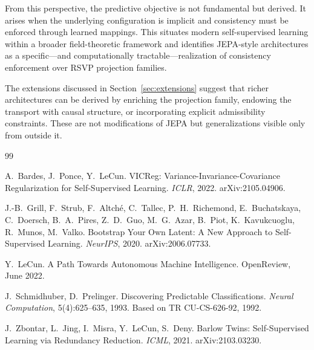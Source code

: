 \documentclass[12pt, oneside]{article}
\begin{document}
From this perspective, the predictive objective is not fundamental but derived. It arises when the underlying configuration is implicit and consistency must be enforced through learned mappings. This situates modern self-supervised learning within a broader field-theoretic framework and identifies JEPA-style architectures as a specific---and computationally tractable---realization of consistency enforcement over RSVP projection families.

The extensions discussed in Section~\ref{sec:extensions} suggest that richer architectures can be derived by enriching the projection family, endowing the transport with causal structure, or incorporating explicit admissibility constraints. These are not modifications of JEPA but generalizations visible only from outside it.

\bigskip

\begin{thebibliography}{99}

A.\ Bardes, J.\ Ponce, Y.\ LeCun.
\newblock VICReg: Variance-Invariance-Covariance Regularization for Self-Supervised Learning.
\newblock \textit{ICLR}, 2022. arXiv:2105.04906.

J.-B.\ Grill, F.\ Strub, F.\ Altch\'e, C.\ Tallec, P.\ H.\ Richemond, E.\ Buchatskaya, C.\ Doersch, B.\ A.\ Pires, Z.\ D.\ Guo, M.\ G.\ Azar, B.\ Piot, K.\ Kavukcuoglu, R.\ Munos, M.\ Valko.
\newblock Bootstrap Your Own Latent: A New Approach to Self-Supervised Learning.
\newblock \textit{NeurIPS}, 2020. arXiv:2006.07733.

Y.\ LeCun.
\newblock A Path Towards Autonomous Machine Intelligence.
\newblock OpenReview, June 2022.

J.\ Schmidhuber, D.\ Prelinger.
\newblock Discovering Predictable Classifications.
\newblock \textit{Neural Computation}, 5(4):625--635, 1993.
\newblock Based on TR CU-CS-626-92, 1992.

J.\ Zbontar, L.\ Jing, I.\ Misra, Y.\ LeCun, S.\ Deny.
\newblock Barlow Twins: Self-Supervised Learning via Redundancy Reduction.
\newblock \textit{ICML}, 2021. arXiv:2103.03230.

\end{thebibliography}
\end{document}
